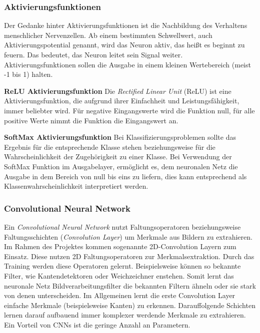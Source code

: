\documentclass[11pt]{article}
\begin{document}
\subsubsection{Aktivierungsfunktionen}
Der Gedanke hinter Aktivierungsfunktionen ist die Nachbildung des Verhaltens menschlicher Nervenzellen. Ab einem bestimmten Schwellwert, auch Aktivierungspotential  genannt, wird das Neuron aktiv, das heißt es beginnt zu feuern. Das bedeutet, das Neuron leitet sein Signal weiter. Aktivierungsfunktionen sollen die Ausgabe in einem kleinen Wertebereich (meist -1 bis 1) halten.\parencite{Manaswi2018}

\textbf{ReLU Aktivierungsfunktion}\newline
Die \textit{Rectified Linear Unit} (ReLU) ist eine Aktivierungsfunktion, die aufgrund ihrer Einfachheit und Leistungsfähigkeit, immer beliebter wird. Für negative Eingangswerte wird die Funktion null, für alle positive Werte nimmt die Funktion die Eingangswert an.\parencite{M.AnderssonM.Arvola}

\textbf{SoftMax Aktivierungsfunktion}\newline
Bei Klassifizierungsproblemen sollte das Ergebnis für die entsprechende Klasse stehen beziehungsweise für die Wahrscheinlichkeit der Zugehörigkeit zu einer Klasse. Bei Verwendung der SoftMax Funktion im Ausgabelayer, ermöglicht es, dem neuronalen Netz die Ausgabe in dem Bereich von null bis eins zu liefern, dies kann entsprechend als Klassenwahrscheinlichkeit interpretiert werden.\parencite{AndreasLindholmNiklasWahlstromFredrikLindsten2019}

\subsubsection{Convolutional Neural Network}
Ein \textit{Convolutional Neural Network} nutzt Faltungsoperatoren beziehungsweise Faltungsschichten (\textit{Convolution Layer}) um Merkmale aus Bildern zu extrahieren. Im Rahmen des Projektes kommen sogenannte 2D-Convolution Layern zum Einsatz. Diese nutzen 2D Faltungsoperatoren zur Merkmalsextraktion. Durch das Training werden diese Operatoren gelernt. Beispielsweise können so bekannte Filter, wie Kantendetektoren oder Weichzeichner enstehen. Somit lernt das neuronale Netz Bildverarbeitungsfilter die bekannten Filtern ähneln oder sie stark von denen unterscheiden. Im Allgemeinen lernt die erste Convolution Layer einfache Merkmale (beispielsweise Kanten) zu erkennen. Darauffolgende Schichten lernen darauf aufbauend immer komplexer werdende Merkmale zu extrahieren. Ein Vorteil von CNNs ist die geringe Anzahl an Parametern.\parencite{Pattanayak2017}
\end{document}
